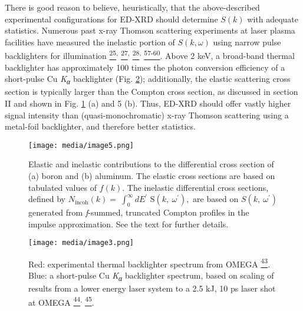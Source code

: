 There is good reason to believe, heuristically, that the above-described
experimental configurations for ED-XRD should determine
\(S\left( k \right)\) with adequate statistics. Numerous past x-ray
Thomson scattering experiments at laser plasma facilities have measured
the inelastic portion of \(S\left( k,\omega \right)\) using narrow pulse
backlighters for illumination
\hyperref[s.-h.-glenzer-and-r.-redmer-reviews-of-modern-physics-81-1625-2009.]{\textsuperscript{25}}\textsuperscript{,}
\hyperref[h.-j.-lee-et-al.-physical-review-letters-102-115001-2009.]{\textsuperscript{27}}\textsuperscript{,}
\hyperref[c.-fortmann-h.-j.-lee-t.-doeppner-r.-w.-falcone-a.-l.-kritcher-o.-l.-landen-and-s.-h.-glenzer-physical-review-letters-108-175006-2012.]{\textsuperscript{28}}\textsuperscript{,}
\hyperref[r.-tommasini-et-al.-review-of-scientific-instruments-79-10e901-2008.]{\textsuperscript{57-60}}.
Above 2 keV, a broad-band thermal backlighter has approximately 100
times the photon conversion efficiency of a short-pulse Cu
\emph{K\textsubscript{α}} backlighter (Fig. \ref{edimage3}); additionally, the
elastic scattering cross section is typically larger than the Compton
cross section, as discussed in section II and shown in Fig. \ref{edimage5} (a) and 5
(b). Thus, ED-XRD should offer vastly higher signal intensity than
(quasi-monochromatic) x-ray Thomson scattering using a metal-foil
backlighter, and therefore better statistics.

\begin{figure}[!ht] \label{edimage5}
\caption{ Elastic and inelastic contributions to the differential cross
section of (a) boron and (b) aluminum. The elastic cross sections are
based on tabulated values of \(f(k)\). The inelastic differential cross
sections, defined by
\(N_{\text{incoh}}\left( k \right) = \ \int_{0}^{\infty}{dE^{'}}\text{\ S}\left( k,\ \omega^{'} \right),\)
are based on \(S\left( k,\ \omega^{'} \right)\) generated from
\emph{f}-summed, truncated Compton profiles in the impulse
approximation. See the text for further details.}
\centering
\texttt{[image: media/image5.png]}
\end{figure}

\FloatBarrier

\begin{figure}[h] \label{edimage3}
\caption{ Red: experimental thermal
backlighter spectrum from OMEGA
\hyperref[b.-yaakobi-2012-private-communication.]{\textsuperscript{43}}\emph{.}
Blue: a short-pulse Cu \emph{K\textsubscript{α}} backlighter spectrum,
based on scaling of results from a lower energy laser system to a 2.5
kJ, 10 ps laser shot at OMEGA
\hyperref[p.-m.-nilson-2012-private-communication.]{\textsuperscript{44}}\textsuperscript{,}
\hyperref[k.-u.-akli-et-al.-physics-of-plasmas-14-023102-2007.]{\textsuperscript{45}}\hyperref[b.-a.-mattern-g.-t.-seidler-j.-j.-kas-j.-i.-pacold-and-j.-j.-rehr-physical-review-b-85-115135-2012.]{}.}
\centering
\texttt{[image: media/image3.png]}
\end{figure}

